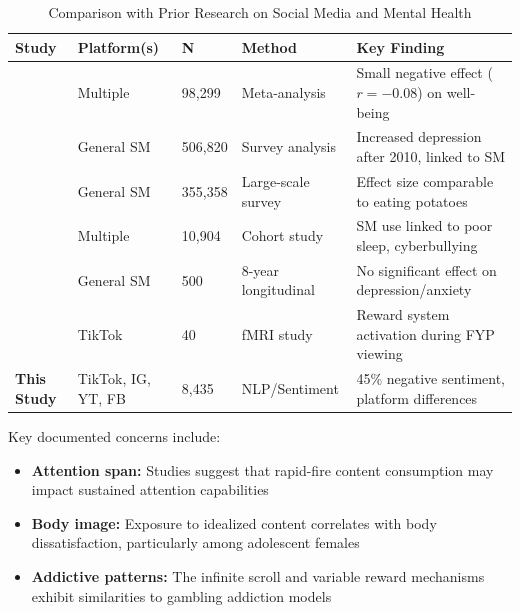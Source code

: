 \documentclass[12pt,a4paper]{article}
\begin{document}
\begin{table}[H]
\centering
\caption{Comparison with Prior Research on Social Media and Mental Health}
\label{tab:literature_comparison}
\small
\begin{tabular}{L{2.5cm}L{2cm}C{1.5cm}L{3cm}L{3.5cm}}
\toprule
\textbf{Study} & \textbf{Platform(s)} & \textbf{N} & \textbf{Method} & \textbf{Key Finding} \\
\midrule
\citet{nguyen2025feeds} & Multiple & 98,299 & Meta-analysis & Small negative effect ($r = -0.08$) on well-being \\
\addlinespace
\citet{twenge2018increases} & General SM & 506,820 & Survey analysis & Increased depression after 2010, linked to SM \\
\addlinespace
\citet{orben2019association} & General SM & 355,358 & Large-scale survey & Effect size comparable to eating potatoes \\
\addlinespace
\citet{kelly2019social} & Multiple & 10,904 & Cohort study & SM use linked to poor sleep, cyberbullying \\
\addlinespace
\citet{coyne2020does} & General SM & 500 & 8-year longitudinal & No significant effect on depression/anxiety \\
\addlinespace
\citet{su2021fmri} & TikTok & 40 & fMRI study & Reward system activation during FYP viewing \\
\addlinespace
\textbf{This Study} & TikTok, IG, YT, FB & 8,435 & NLP/Sentiment & 45\% negative sentiment, platform differences \\
\bottomrule
\end{tabular}
\end{table}

Key documented concerns include:

\begin{itemize}[leftmargin=*, itemsep=0.3em]
    \item \textbf{Attention span:} Studies suggest that rapid-fire content consumption may impact sustained attention capabilities \citep{su2021fmri}
    \item \textbf{Body image:} Exposure to idealized content correlates with body dissatisfaction, particularly among adolescent females \citep{fardouly2022social, tiggemann2018media}
    \item \textbf{Addictive patterns:} The infinite scroll and variable reward mechanisms exhibit similarities to gambling addiction models \citep{montag2021addictive, andreassen2016bergen}
\end{itemize}
\end{document}

